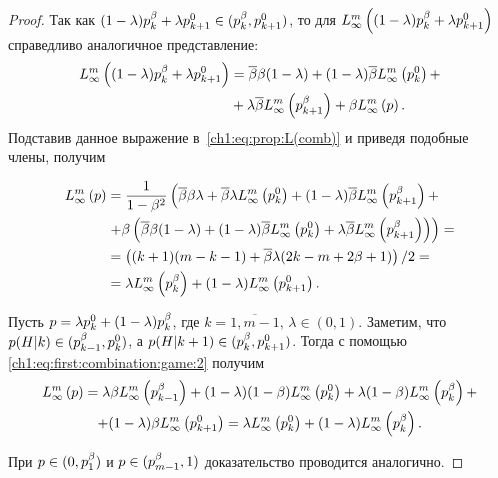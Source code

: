 {\begin{proof}
  Так как $(1-\lambda)\pOdd + \lambda \pEven[k+1] \in (\pOdd, \pEven[k+1])$, то для $\lowerBound{(1-\lambda)\pOdd + \lambda \pEven[k+1]}$ справедливо аналогичное представление:
  \begin{align*}
    \lowerBound{(1-\lambda)\pOdd + \lambda \pEven[k+1]} 
    &=
    \DCo\Co(1-\lambda) +
    (1-\lambda)\DCo\lowerBound{\pEven} + \\
    &+ \lambda\DCo\lowerBound{\pOdd[k+1]} +
    \Co \lowerBound{p}.
  \end{align*}
  Подставив данное выражение в~\eqref{ch1:eq:prop:L(comb)} и приведя подобные члены, получим

  \begin{equation}
    \label{ch1:eq:first:combination:game:2}
    \begin{aligned}
      \lowerBound{p} 
      &= 
      \frac{1}{1-\Co^2}
      \left(
        \DCo\Co\lambda + 
        \DCo\lambda\lowerBound{\pEven} + 
        (1-\lambda)\DCo\lowerBound{\pOdd[k+1]} + 
      \right.\\
      &\left. 
        + \Co \left( 
          \DCo\Co(1-\lambda) +
          (1-\lambda)\DCo\lowerBound{\pEven} +
          \lambda\DCo\lowerBound{\pOdd[k+1]} 
        \right)
      \right) = \\
      &=
      \left( (k + 1)(m - k - 1) + \DCo\lambda(2k - m + 2\Co + 1)
      \right)/2 = \\
      &=
      \lambda\lowerBound{\pOdd} + (1-\lambda)\lowerBound{\pEven[k+1]}.
    \end{aligned}
  \end{equation}
  
  Пусть $p = \lambda\pEven + (1-\lambda)\pOdd$, где $k = \overline{1, m - 1}, \, \lambda \in (0, 1)$.
  Заметим, что $p(H|k) \in ( \pOdd[k-1], \pEven )$, а $p(H|k+1) \in ( \pOdd, \pEven[k+1] )$.
  Тогда с помощью \eqref{ch1:eq:first:combination:game:2} получим
  \begin{multline*}
    \lowerBound{p} =
    \lambda \Co \lowerBound{\pOdd[k-1]} + 
    (1-\lambda)(1-\Co)\lowerBound{\pEven} + \lambda(1-\Co)\lowerBound{\pOdd} + \\
    + (1-\lambda)\Co\lowerBound{\pEven[k+1]} 
    = \lambda \lowerBound{\pEven} + (1-\lambda) \lowerBound{\pOdd}.
  \end{multline*}
  
  При $p \in ( 0, \pOdd[1] )$ и $p \in ( \pOdd[m-1], 1 )$ доказательство проводится аналогично.
\end{proof}

}
